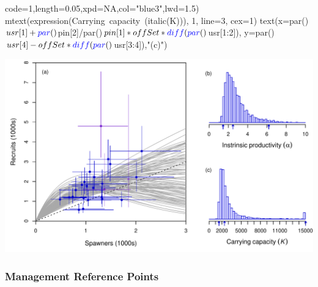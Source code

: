 \documentclass[
  11pt,
]{article}
\newenvironment{Shaded}{}{}
\newcommand{\DataTypeTok}[1]{#1}
\newcommand{\DecValTok}[1]{#1}
\newcommand{\FloatTok}[1]{#1}
\newcommand{\KeywordTok}[1]{\textcolor[rgb]{0.00,0.00,1.00}{#1}}
\newcommand{\NormalTok}[1]{#1}
\newcommand{\OperatorTok}[1]{#1}
\newcommand{\OtherTok}[1]{\textcolor[rgb]{1.00,0.25,0.00}{#1}}
\newcommand{\StringTok}[1]{\textcolor[rgb]{0.00,0.50,0.50}{#1}}
\begin{document}
\begin{Shaded}
\begin{Highlighting}[]
       \DataTypeTok{code=}\DecValTok{1}\NormalTok{,}\DataTypeTok{length=}\FloatTok{0.05}\NormalTok{,}\DataTypeTok{xpd=}\OtherTok{NA}\NormalTok{,}\DataTypeTok{col=}\StringTok{"blue3"}\NormalTok{,}\DataTypeTok{lwd=}\FloatTok{1.5}\NormalTok{)}
\KeywordTok{mtext}\NormalTok{(}\KeywordTok{expression}\NormalTok{(Carrying}\OperatorTok{~}\NormalTok{capacity}\OperatorTok{~}\NormalTok{(}\KeywordTok{italic}\NormalTok{(K))), }\DecValTok{1}\NormalTok{, }\DataTypeTok{line=}\DecValTok{3}\NormalTok{, }\DataTypeTok{cex=}\DecValTok{1}\NormalTok{)}
\KeywordTok{text}\NormalTok{(}\DataTypeTok{x=}\KeywordTok{par}\NormalTok{()}\OperatorTok{$}\NormalTok{usr[}\DecValTok{1}\NormalTok{]}\OperatorTok{+}\KeywordTok{par}\NormalTok{()}\OperatorTok{$}\NormalTok{pin[}\DecValTok{2}\NormalTok{]}\OperatorTok{/}\KeywordTok{par}\NormalTok{()}\OperatorTok{$}\NormalTok{pin[}\DecValTok{1}\NormalTok{]}\OperatorTok{*}\NormalTok{offSet}\OperatorTok{*}\KeywordTok{diff}\NormalTok{(}\KeywordTok{par}\NormalTok{()}\OperatorTok{$}\NormalTok{usr[}\DecValTok{1}\OperatorTok{:}\DecValTok{2}\NormalTok{]),}
     \DataTypeTok{y=}\KeywordTok{par}\NormalTok{()}\OperatorTok{$}\NormalTok{usr[}\DecValTok{4}\NormalTok{]}\OperatorTok{-}\NormalTok{offSet}\OperatorTok{*}\KeywordTok{diff}\NormalTok{(}\KeywordTok{par}\NormalTok{()}\OperatorTok{$}\NormalTok{usr[}\DecValTok{3}\OperatorTok{:}\DecValTok{4}\NormalTok{]),}\StringTok{"(c)"}\NormalTok{)}
\end{Highlighting}
\end{Shaded}

\includegraphics{App_2_Summarize_results_Spring_Chinook_files/figure-latex/plot_S_R-1.pdf}

\hypertarget{management-reference-points}{%
\subsubsection{Management Reference
Points}\label{management-reference-points}}
\end{document}
